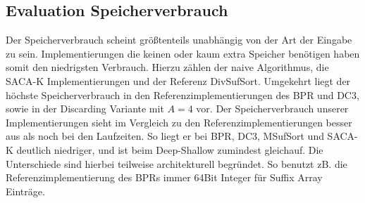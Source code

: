 \subsection{Evaluation Speicherverbrauch}

Der Speicherverbrauch scheint größtenteils unabhängig von der Art der Eingabe zu sein. Implementierungen die keinen oder kaum extra Speicher benötigen haben somit den niedrigsten Verbrauch. Hierzu zählen der naive Algorithmus, die SACA-K Implementierungen und der Referenz DivSufSort. Umgekehrt liegt der höchste Speicherverbrauch in den Referenzimplementierungen des BPR und DC3, sowie in der Discarding Variante mit $A=4$ vor.
Der Speicherverbrauch unserer Implementierungen sieht im Vergleich zu den Referenzimplementierungen besser aus als noch bei den Laufzeiten. So liegt er bei BPR, DC3, MSufSort und SACA-K deutlich niedriger, und ist beim Deep-Shallow zumindest gleichauf. Die Unterschiede sind hierbei teilweise architekturell begründet. So benutzt zB. die Referenzimplementierung des BPRs immer 64Bit Integer für Suffix Array Einträge.
